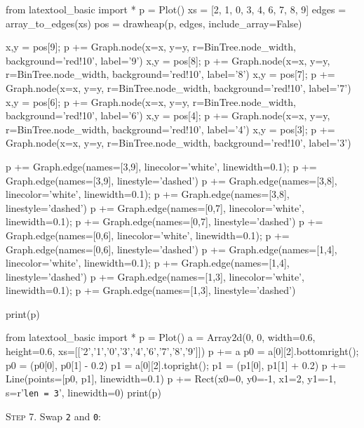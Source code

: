 \begin{python}
from latextool_basic import *
p = Plot()
xs = [2, 1, 0, 3, 4, 6, 7, 8, 9]
edges = array_to_edges(xs)
pos = drawheap(p, edges, include_array=False)

x,y = pos[9]; p += Graph.node(x=x, y=y, r=BinTree.node_width, background='red!10', label='9')
x,y = pos[8]; p += Graph.node(x=x, y=y, r=BinTree.node_width, background='red!10', label='8')
x,y = pos[7]; p += Graph.node(x=x, y=y, r=BinTree.node_width, background='red!10', label='7')
x,y = pos[6]; p += Graph.node(x=x, y=y, r=BinTree.node_width, background='red!10', label='6')
x,y = pos[4]; p += Graph.node(x=x, y=y, r=BinTree.node_width, background='red!10', label='4')
x,y = pos[3]; p += Graph.node(x=x, y=y, r=BinTree.node_width, background='red!10', label='3')

p += Graph.edge(names=[3,9], linecolor='white', linewidth=0.1); p += Graph.edge(names=[3,9], linestyle='dashed')
p += Graph.edge(names=[3,8], linecolor='white', linewidth=0.1); p += Graph.edge(names=[3,8], linestyle='dashed')
p += Graph.edge(names=[0,7], linecolor='white', linewidth=0.1); p += Graph.edge(names=[0,7], linestyle='dashed')
p += Graph.edge(names=[0,6], linecolor='white', linewidth=0.1); p += Graph.edge(names=[0,6], linestyle='dashed')
p += Graph.edge(names=[1,4], linecolor='white', linewidth=0.1); p += Graph.edge(names=[1,4], linestyle='dashed')
p += Graph.edge(names=[1,3], linecolor='white', linewidth=0.1); p += Graph.edge(names=[1,3], linestyle='dashed')

print(p)
\end{python}
\begin{python}
from latextool_basic import *
p = Plot()
a = Array2d(0, 0, width=0.6, height=0.6, 
             xs=[['2','1','0','3','4','6','7','8','9']])
p += a
p0 = a[0][2].bottomright(); p0 = (p0[0], p0[1] - 0.2)
p1 = a[0][2].topright(); p1 = (p1[0], p1[1] + 0.2)
p += Line(points=[p0, p1], linewidth=0.1)
p += Rect(x0=0, y0=-1, x1=2, y1=-1, s=r'\texttt{len = 3}', linewidth=0) 
print(p)
\end{python}


\textsc{Step 7}.
Swap \texttt{2} and \texttt{0}:

